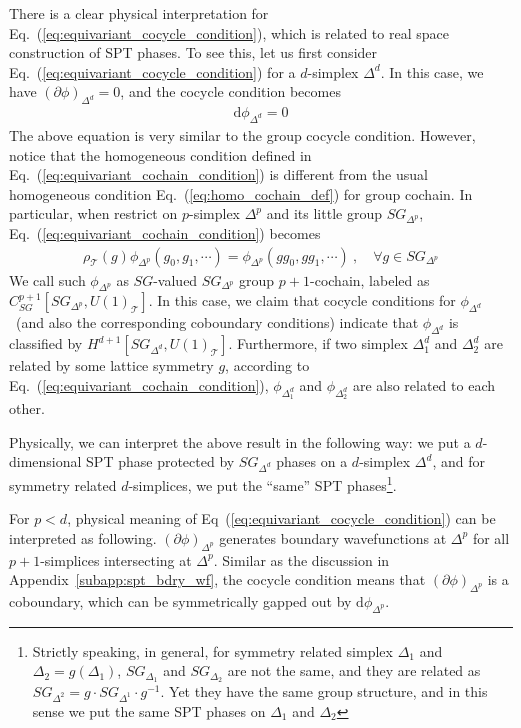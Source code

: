 \documentclass[%
  reprint,
  amsmath,amssymb,
  aps,pra,
]{revtex4-1}
\newcommand{\dd}{\mathrm{d}} %
\newcommand{\TT}{\mathcal{T}} %
\begin{document}
There is a clear physical interpretation for Eq.~(\ref{eq:equivariant_cocycle_condition}), which is related to real space construction of SPT phases.
To see this, let us first consider Eq.~(\ref{eq:equivariant_cocycle_condition}) for a $d$-simplex $\Delta^d$.
In this case, we have $(\partial\phi)_{\Delta^d}=0$, and the cocycle condition becomes
\begin{align}
  \dd\phi_{\Delta^d}=0
\end{align}
The above equation is very similar to the group cocycle condition. 
However, notice that the homogeneous condition defined in Eq.~(\ref{eq:equivariant_cochain_condition}) is different from the usual homogeneous condition Eq.~(\ref{eq:homo_cochain_def}) for group cochain.
In particular, when restrict on $p$-simplex $\Delta^p$ and its little group $SG_{\Delta^p}$, Eq.~(\ref{eq:equivariant_cochain_condition}) becomes
\begin{align}
  \rho_{\TT}(g)\phi_{\Delta^p}(g_0,g_1,\cdots)= \phi_{\Delta^p}(gg_0,gg_1,\cdots)~,\quad\forall g\in SG_{\Delta^p}
  \label{eq:SG-valued_SG_delta_cochain}
\end{align}
We call such $\phi_{\Delta^p}$ as $SG$-valued $SG_{\Delta^p}$ group $p+1$-cochain, labeled as $C_{SG}^{p+1}[SG_{\Delta^p},U(1)_\TT]$.
In this case, we claim that cocycle conditions for $\phi_{\Delta^d}$~(and also the corresponding coboundary conditions) indicate that $\phi_{\Delta^d}$ is classified by $H^{d+1}[SG_{\Delta^d},U(1)_\TT]$.
Furthermore, if two simplex $\Delta^d_1$ and $\Delta^d_2$ are related by some lattice symmetry $g$, according to Eq.~(\ref{eq:equivariant_cochain_condition}), $\phi_{\Delta_1^d}$ and $\phi_{\Delta_2^d}$ are also related to each other.

Physically, we can interpret the above result in the following way: we put a $d$-dimensional SPT phase protected by $SG_{\Delta^d}$ phases on a $d$-simplex $\Delta^d$, 
and for symmetry related $d$-simplices, we put the ``same'' SPT phases\footnote{Strictly speaking, in general, for symmetry related simplex $\Delta_1$ and $\Delta_2=g(\Delta_1)$, $SG_{\Delta_1}$ and $SG_{\Delta_2}$ are not the same, and they are related as $SG_{\Delta^2}=g\cdot SG_{\Delta^1}\cdot g^{-1}$.
Yet they have the same group structure, and in this sense we put the same SPT phases on $\Delta_1$ and $\Delta_2$}.

For $p<d$, physical meaning of Eq~(\ref{eq:equivariant_cocycle_condition}) can be interpreted as following.
$(\partial\phi)_{\Delta^p}$ generates boundary wavefunctions at $\Delta^p$ for all $p+1$-simplices intersecting at $\Delta^p$.
Similar as the discussion in Appendix~\ref{subapp:spt_bdry_wf}, the cocycle condition means that $(\partial\phi)_{\Delta^p}$ is a coboundary, which can be symmetrically gapped out by $\dd\phi_{\Delta^p}$.
\end{document}

